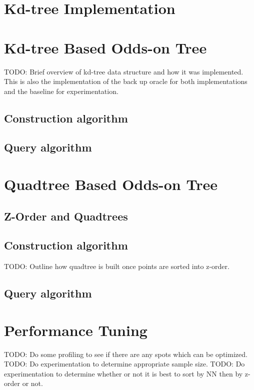\documentclass[mcs]{scsthesis}
\begin{document}
\section{Kd-tree Implementation}

\section{Kd-tree Based Odds-on Tree}

TODO: Brief overview of kd-tree data structure and how it was implemented.  This
is also the implementation of the back up oracle for both implementations and the
baseline for experimentation. 

\subsection{Construction algorithm}

\subsection{Query algorithm}

\section{Quadtree Based Odds-on Tree}

\subsection{Z-Order and Quadtrees}


\subsection{Construction algorithm}

TODO: Outline how quadtree is built once points are sorted into z-order.

\subsection{Query algorithm}


\section{Performance Tuning}

TODO: Do some profiling to see if there are any spots which can be optimized. 
TODO: Do experimentation to determine appropriate sample size.
TODO: Do experimentation to determine whether or not it is best to sort by NN
      then by z-order or not.
\end{document}
